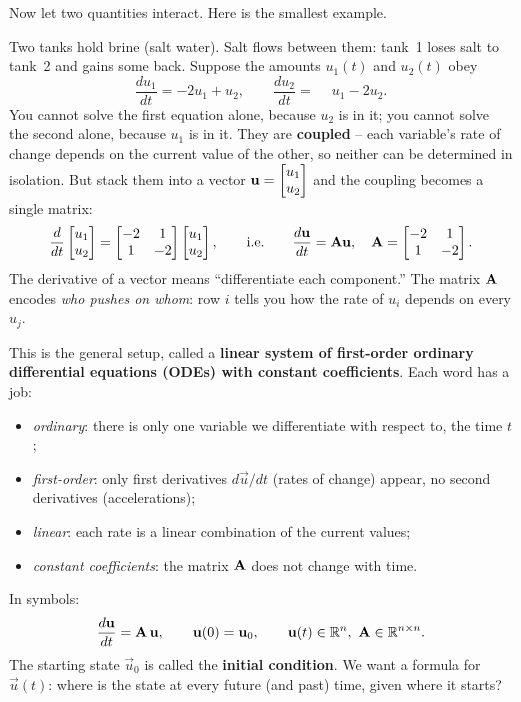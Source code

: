 Now let two quantities interact. Here is the smallest example.

\begin{example}
\label{ch25:tanks}
Two tanks hold brine (salt water). Salt flows between them: tank~1 loses salt to tank~2 and
gains some back. Suppose the amounts $u_1(t)$ and $u_2(t)$ obey
\[
  \frac{du_1}{dt} = -2u_1 + u_2, \qquad
  \frac{du_2}{dt} = \phantom{-}u_1 - 2u_2.
\]
You cannot solve the first equation alone, because $u_2$ is in it; you cannot
solve the second alone, because $u_1$ is in it. They are \textbf{coupled} --
each variable's rate of change depends on the current value of the other, so
neither can be determined in isolation. But stack them into a vector
$\mathbf{u} = \begin{bmatrix}u_1\\u_2\end{bmatrix}$ and the coupling becomes a single matrix:
\[
  \frac{d}{dt}\begin{bmatrix}u_1\\u_2\end{bmatrix}
  = \begin{bmatrix} -2 & 1 \\ 1 & -2 \end{bmatrix}\begin{bmatrix}u_1\\u_2\end{bmatrix},
  \qquad\text{i.e.}\qquad
  \frac{d\mathbf{u}}{dt} = \mathbf{A}\mathbf{u},
  \quad \mathbf{A} = \begin{bmatrix} -2 & 1 \\ 1 & -2 \end{bmatrix}.
\]
The derivative of a vector means ``differentiate each component.'' The
matrix $\mathbf{A}$ encodes \emph{who pushes on whom}: row $i$ tells you how the
rate of $u_i$ depends on every $u_j$.
\end{example}

This is the general setup, called a \textbf{linear system of first-order
ordinary differential equations (ODEs) with constant coefficients}. Each word
has a job:
\begin{itemize}
  \item \emph{ordinary}: there is only one variable we differentiate with
        respect to, the time $t$;
  \item \emph{first-order}: only first derivatives $d\vec{u}/dt$ (rates of
        change) appear, no second derivatives (accelerations);
  \item \emph{linear}: each rate is a linear combination of the current values;
  \item \emph{constant coefficients}: the matrix $\mathbf{A}$ does not change
        with time.
\end{itemize}
In symbols:
\[
  \frac{d\mathbf{u}}{dt} = \mathbf{A}\,\mathbf{u},
  \qquad \mathbf{u}(0) = \mathbf{u}_0,
  \qquad \mathbf{u}(t)\in\mathbb{R}^n,\ \mathbf{A}\in\mathbb{R}^{n\times n}.
\]
The starting state $\vec{u}_0$ is called the \textbf{initial condition}. We
want a formula for $\vec{u}(t)$: where is the state at every future (and past)
time, given where it starts?

